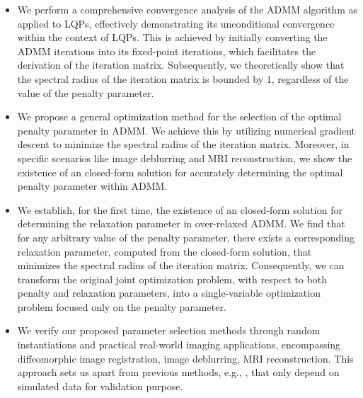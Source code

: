 \documentclass[letterpaper]{article} %
\begin{document}
\begin{itemize}
\item We perform a comprehensive convergence analysis of the ADMM algorithm as applied to LQPs, effectively demonstrating its unconditional convergence within the context of LQPs. This is achieved by initially converting the ADMM iterations into its fixed-point iterations, which facilitates the derivation of the iteration matrix. Subsequently, we theoretically show that the spectral radius of the iteration matrix is bounded by $1$, regardless of the value of the penalty parameter.
\item We propose a general optimization method for the selection of the optimal penalty parameter in ADMM. We achieve this by utilizing numerical gradient descent to minimize the spectral radius of the iteration matrix. Moreover, in specific scenarios like image deblurring and MRI reconstruction, we show the existence of an closed-form solution for accurately determining the optimal penalty parameter within ADMM.
\item We establish, for the first time, the existence of an closed-form solution for determining the relaxation parameter in over-relaxed ADMM. We find that for any arbitrary value of the penalty parameter, there exists a corresponding relaxation parameter, computed from the closed-form solution, that minimizes the spectral radius of the iteration matrix. Consequently, we can transform the original joint optimization problem, with respect to both penalty and relaxation parameters, into a single-variable optimization problem focused only on the penalty parameter.

\item We verify our proposed parameter selection methods through random instantiations and practical real-world imaging applications, encompassing diffeomorphic image registration, image deblurring, MRI reconstruction. This approach sets us apart from previous methods, e.g., \cite{ghadimi2014optimal}, that only depend on simulated data for validation purpose.
\end{itemize}
\end{document}
